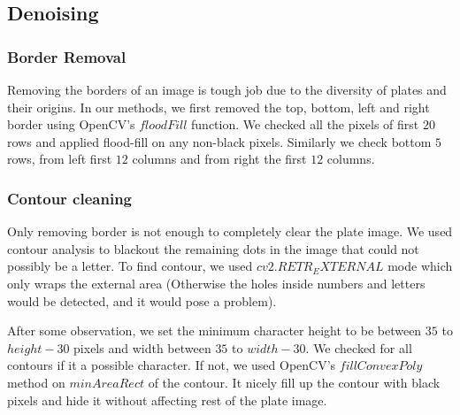\documentclass{standalone}
\begin{document}
\subsection{Denoising}

\subsubsection{Border Removal}
Removing the borders of an image is tough job due to the diversity of plates and their origins. In our methods, we first removed the top, bottom, left and right border using OpenCV's $floodFill$ function. We checked all the pixels of first $20$ rows and applied flood-fill on any non-black pixels. Similarly we check bottom $5$ rows, from left first $12$ columns and from right the first $12$ columns.

\subsubsection{Contour cleaning}
Only removing border is not enough to completely clear the plate image. We used contour analysis to blackout the remaining dots in the image that could not possibly be a letter. To find contour, we used $cv2.RETR_EXTERNAL$ mode which only wraps the external area (Otherwise the holes inside numbers and letters would be detected, and it would pose a problem).

After some observation, we set the minimum character height to be between $35$ to $height-30$ pixels and width between $35$ to $width-30$. We checked for all contours if it a possible character. If not, we used OpenCV's $fillConvexPoly$ method on $minAreaRect$ of the contour. It nicely fill up the contour with black pixels and hide it without affecting rest of the plate image.
\end{document}
